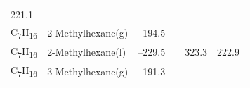 \documentclass[
  9pt,
]{extbook}
\theoremstyle{definition}
\theoremstyle{definition}
\theoremstyle{definition}
\theoremstyle{remark}
\begin{document}
\begin{longtable}[]{@{}llllll@{}}
\begin{minipage}[t]{0.14\columnwidth}
221.1\strut
\end{minipage}\tabularnewline
\begin{minipage}[t]{0.07\columnwidth}\raggedright
C\textsubscript{7}H\textsubscript{16}\strut
\end{minipage} & \begin{minipage}[t]{0.17\columnwidth}\raggedright
2-Methylhexane(g)\strut
\end{minipage} & \begin{minipage}[t]{0.15\columnwidth}\raggedright
--194.5\strut
\end{minipage} & \begin{minipage}[t]{0.15\columnwidth}\raggedright
\strut
\end{minipage} & \begin{minipage}[t]{0.14\columnwidth}\raggedright
\strut
\end{minipage} & \begin{minipage}[t]{0.14\columnwidth}\raggedright
\strut
\end{minipage}\tabularnewline
\begin{minipage}[t]{0.07\columnwidth}\raggedright
C\textsubscript{7}H\textsubscript{16}\strut
\end{minipage} & \begin{minipage}[t]{0.17\columnwidth}\raggedright
2-Methylhexane(l)\strut
\end{minipage} & \begin{minipage}[t]{0.15\columnwidth}\raggedright
--229.5\strut
\end{minipage} & \begin{minipage}[t]{0.15\columnwidth}\raggedright
\strut
\end{minipage} & \begin{minipage}[t]{0.14\columnwidth}\raggedright
323.3\strut
\end{minipage} & \begin{minipage}[t]{0.14\columnwidth}\raggedright
222.9\strut
\end{minipage}\tabularnewline
\begin{minipage}[t]{0.07\columnwidth}\raggedright
C\textsubscript{7}H\textsubscript{16}\strut
\end{minipage} & \begin{minipage}[t]{0.17\columnwidth}\raggedright
3-Methylhexane(g)\strut
\end{minipage} & \begin{minipage}[t]{0.15\columnwidth}\raggedright
--191.3\strut
\end{minipage} & \begin{minipage}[t]{0.15\columnwidth}\raggedright

\end{minipage}
\end{longtable}
\end{document}
